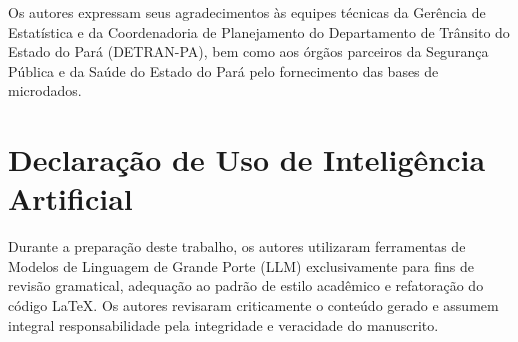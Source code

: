 \documentclass[sigconf, nonacm, screen, language=portuguese, language=spanish, language={main=english}]{acmart}
\begin{document}
\begin{acks}
Os autores expressam seus agradecimentos às equipes técnicas da Gerência de Estatística e da Coordenadoria de Planejamento do Departamento de Trânsito do Estado do Pará (DETRAN-PA), bem como aos órgãos parceiros da Segurança Pública e da Saúde do Estado do Pará pelo fornecimento das bases de microdados.
\end{acks}

\section*{Declaração de Uso de Inteligência Artificial}
Durante a preparação deste trabalho, os autores utilizaram ferramentas de Modelos de Linguagem de Grande Porte (LLM) exclusivamente para fins de revisão gramatical, adequação ao padrão de estilo acadêmico e refatoração do código LaTeX. Os autores revisaram criticamente o conteúdo gerado e assumem integral responsabilidade pela integridade e veracidade do manuscrito.
\end{document}
